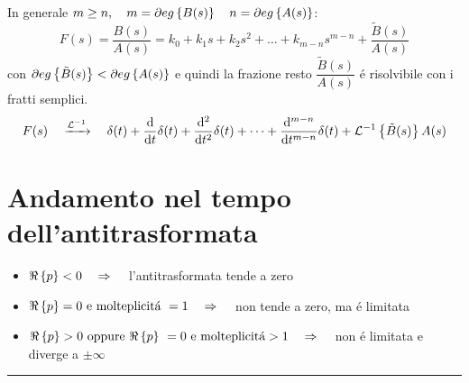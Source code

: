 \documentclass[../main.tex]{subfiles}
\begin{document}
		In generale $ m \geq n, \quad m = \partial eg \left\lbrace B(s) \right\rbrace \quad n = \partial eg \left\lbrace A(s) \right\rbrace $:
		\[
			F(s) = \frac{B(s)}{A(s)} = k_0 + k_1 s + k_2 s^2 + \dots + k_{m-n} s^{m-n} + \frac{\tilde{B}(s)}{A(s)}
		\]
		con $ \partial eg \left\lbrace \tilde{B}(s) \right\rbrace < \partial eg \left\lbrace A(s) \right\rbrace $ e quindi la frazione resto $ \dfrac{\tilde B(s)}{A(s)} $ \'{e} risolvibile con i fratti semplici.
		\[
			F(s) \quad \xrightarrow{\mathcal{L}^{-1}} \quad \delta(t) + \frac{\mathrm{d} }{\mathrm{d} t} \delta(t) + \frac{\mathrm{d} ^2}{\mathrm{d} t^2} \delta(t) + \dots + \frac{\mathrm{d} ^{m-n}}{\mathrm{d} t^{m-n}} \delta(t) + \mathcal{L}^{-1} \left\lbrace \tilde{B}(s) \right\rbrace{A(s)}
		\]

	\section{Andamento nel tempo dell'antitrasformata}
		\begin{itemize}
			\item 
				$ \Re \left\lbrace p \right\rbrace < 0 \quad \Rightarrow \quad $ l'antitrasformata tende a zero
			\item 
				$ \re{p} = 0\ \text{e molteplicit\'{a}}\ = 1 \quad \Rightarrow \quad $ non tende a zero, ma \'{e} limitata
			\item 
				$ \re{p} > 0\ \text{oppure}\ \re{p}\ = 0\ \text{e molteplicit\'{a}} > 1 \quad \Rightarrow \quad $ non \'{e} limitata e diverge a $ \pm \infty $
		\end{itemize}
		\rule{\linewidth}{0.4pt}
\end{document}
